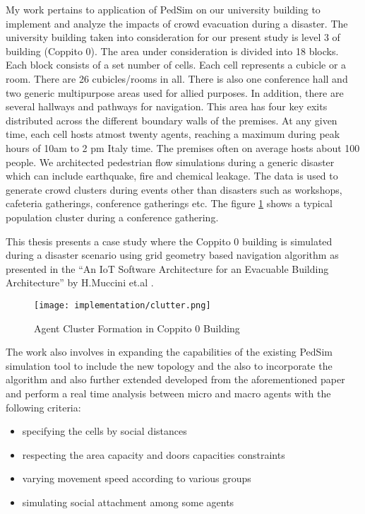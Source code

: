 My work pertains to application of PedSim on our university building to implement and analyze the impacts of crowd evacuation during a disaster. The university building taken into consideration for our present study is level 3 of building (Coppito 0). The area under consideration is divided into 18 blocks. Each block consists of a set number of cells. Each cell represents a cubicle or a room. There are 26 cubicles/rooms in all. There is also one conference hall and two generic multipurpose areas used for allied purposes. In addition, there are several hallways and pathways for navigation. This area has four key exits distributed across the different boundary walls of the premises. At any given time, each cell hosts atmost twenty agents, reaching a maximum during peak hours of 10am to 2 pm Italy time. The premises often on average hosts about 100 people. We architected pedestrian flow simulations during a generic disaster which can include earthquake, fire and chemical leakage. The data is used to generate crowd clusters during events other than disasters such as workshops, cafeteria gatherings, conference gatherings etc. The figure \ref{clutter} shows a typical population cluster during a conference gathering. 

This thesis presents a case study where the Coppito 0 building is simulated during a disaster scenario using grid geometry based navigation algorithm as presented in the “An IoT Software Architecture for an Evacuable Building Architecture” by H.Muccini et.al \cite{ref5}. 

\begin{figure}[H]
  \centering
  \texttt{[image: implementation/clutter.png]}
	\caption{Agent Cluster Formation in Coppito 0 Building}
  \label{clutter}
\end{figure}

The work also involves in expanding the capabilities of the existing PedSim simulation tool to include the new topology and the also to incorporate the algorithm and also further extended developed from the aforementioned paper and perform a real time analysis between micro and macro agents with the following criteria:

\begin{itemize}
  \item specifying the cells by social distances
  \item respecting the area capacity and doors capacities constraints
  \item varying movement speed according to various groups
  \item simulating social attachment among some agents 
\end{itemize}

